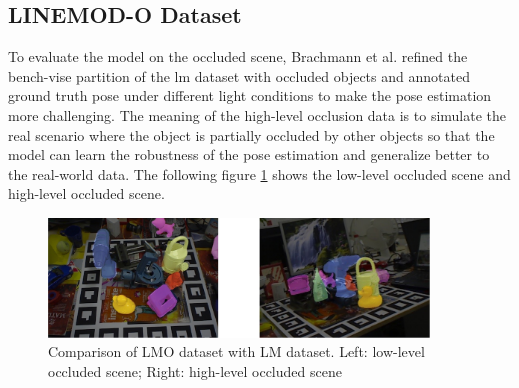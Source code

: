 \documentclass[12pt,DIV14,BCOR12mm,a4paper,footinclude=false,headinclude,parskip=half-,twoside,openright,cleardoublepage=empty,toc=index,bibliography=totoc,listof=totoc]{scrreprt}
\numberwithin{equation}{chapter}
\begin{document}
\subsection{LINEMOD-O Dataset}
To evaluate the model on the occluded scene, Brachmann et al. \cite{dataV4MUMX2020} refined the bench-vise partition of the \gls{lm} dataset with occluded objects and annotated ground truth pose under different light conditions to make the pose estimation more challenging. The meaning of the high-level occlusion data is to simulate the real scenario where the object is partially occluded by other objects so that the model can learn the robustness of the pose estimation and generalize better to the real-world data. The following figure \ref{img:linemod_o} shows the low-level occluded scene and high-level occluded scene.
\begin{figure}[h]
  \centering
  \includegraphics[width=0.9\textwidth]{img/lmo.pdf}
  \caption{Comparison of LMO dataset with LM dataset. Left: low-level occluded scene; Right: high-level occluded scene}
  \label{img:linemod_o}
\end{figure}
\end{document}
